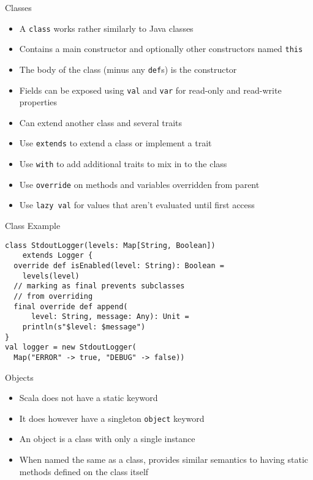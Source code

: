 \documentclass{beamer}
\begin{document}
\begin{frame}{Classes}
\begin{itemize}
\item A \lstinline{class} works rather similarly to Java classes
\item Contains a main constructor and optionally other constructors named \lstinline{this}
\item The body of the class (minus any \lstinline{def}s) is the constructor
\item Fields can be exposed using \lstinline{val} and \lstinline{var} for read-only
and read-write properties
\item Can extend another class and several traits
\item Use \lstinline{extends} to extend a class or implement a trait
\item Use \lstinline{with} to add additional traits to mix in to the class
\item Use \lstinline{override} on methods and variables overridden from parent
\item Use \lstinline{lazy val} for values that aren't evaluated until first access
\end{itemize}
\end{frame}

\begin{frame}[fragile]{Class Example}
\begin{lstlisting}
class StdoutLogger(levels: Map[String, Boolean])
    extends Logger {
  override def isEnabled(level: String): Boolean =
    levels(level)
  // marking as final prevents subclasses
  // from overriding
  final override def append(
      level: String, message: Any): Unit =
    println(s"$level: $message")
}
val logger = new StdoutLogger(
  Map("ERROR" -> true, "DEBUG" -> false))
\end{lstlisting}
\end{frame}

\begin{frame}{Objects}
\begin{itemize}
\item Scala does not have a static keyword
\item It does however have a singleton \lstinline{object} keyword
\item An object is a class with only a single instance
\item When named the same as a class, provides similar semantics to having static
methods defined on the class itself
\end{itemize}
\end{frame}
\end{document}
